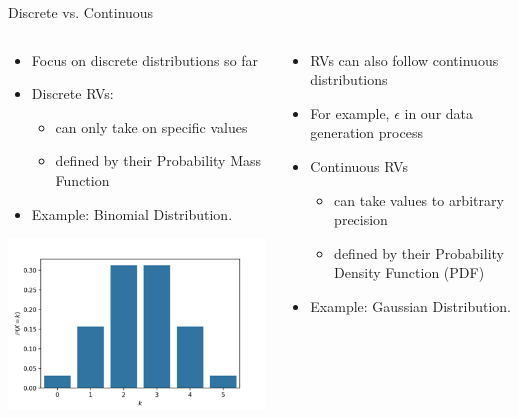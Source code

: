 \documentclass[aspectratio=169]{../latex_main/tntbeamer}  %
\begin{document}
	
	\begin{frame}[c]{Discrete vs. Continuous}
	    
	   \vspace{-2em}
	    \begin{columns}
	    
	        \begin{column}{.5\textwidth}
	        
	           \begin{itemize}
	               \item Focus on discrete distributions so far 
	               \item Discrete RVs:
	               \begin{itemize}
	                   \item can only take on specific values
	                   \item defined by their Probability Mass Function
	               \end{itemize}
	               \item Example: Binomial Distribution.
	           \end{itemize}
                        \centering
                        \includegraphics[scale=.5]{Bild4}
                        
	        \end{column}
	        
	        \begin{column}{.5\textwidth}
	        
	                \begin{itemize}
	                    \item RVs can also follow continuous distributions
	                    \item For example, $\epsilon$ in our data generation process
	                    \item Continuous RVs 
	                    \begin{itemize}
	                        \item can take values to arbitrary precision
	                        \item defined by their Probability Density Function (PDF)
	                    \end{itemize}
	                    \item Example: Gaussian Distribution.\\
	                \end{itemize}
	                

\end{column}
\end{columns}
\end{frame}
\end{document}
